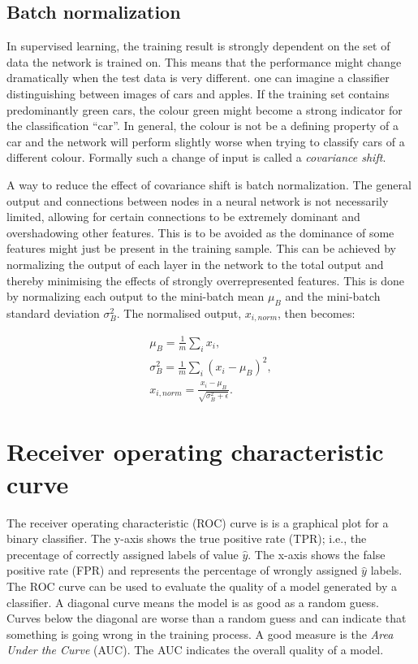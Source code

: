 \subsection{Batch normalization}
\label{sec:batch_norm}

In supervised learning, the training result is strongly dependent on the set of data the network is trained on. This means that the performance might change dramatically when the test data is very different. one can imagine a classifier distinguishing between images of cars and apples. If the training set contains predominantly green cars, the colour green might become a strong indicator for the classification \enquote{car}. In general, the colour is not be a defining property of a car and the network will perform slightly worse when trying to classify cars of a different colour. Formally such a change of input is called a \emph{covariance shift}.

A way to reduce the effect of covariance shift is batch normalization. The general output and connections between nodes in a neural network is not necessarily limited, allowing for certain connections to be extremely dominant and overshadowing other features. This is to be avoided as the dominance of some features might just be present in the training sample. This can be achieved by normalizing the output of each layer in the network to the total output and thereby minimising the effects of strongly overrepresented features. This is done by normalizing each output to the mini-batch mean $\mu_B$ and the mini-batch standard deviation $\sigma_B^2$. The normalised output, $x_{i,norm}$, then becomes:

\begin{align}
    \mu_B = \frac{1}{m} \sum_i x_i,\\
    \sigma_B^2 = \frac{1}{m} \sum_i (x_i - \mu_B)^2,\\
    x_{i,norm} = \frac{x_i - \mu_B}{\sqrt{\sigma_B^2 + \epsilon}}.
\end{align}

\section{Receiver operating characteristic curve}

The receiver operating characteristic (ROC) curve is is a graphical plot for a binary classifier. The y-axis shows the true positive rate (TPR); {i.e.}, the precentage of correctly assigned labels of value $\hat{y}$. The x-axis shows the false positive rate (FPR) and represents the percentage of wrongly assigned $\hat{y}$ labels. The ROC curve can be used to evaluate the quality of a model generated by a classifier. A diagonal curve means the model is as good as a random guess. Curves below the diagonal are worse than a random guess and can indicate that something is going wrong in the training process. A good measure is the \emph{Area Under the Curve} (AUC). The AUC indicates the overall quality of a model.





